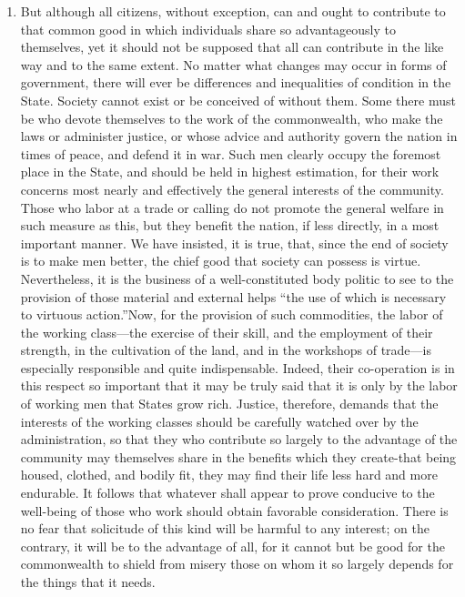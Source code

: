 \documentclass{book}
\begin{document}
\begin{enumerate}
	\item But although all citizens, without exception, can and ought to contribute to that common good in which individuals share so advantageously to themselves, yet it should not be supposed that all can contribute in the like way and to the same extent. No matter what changes may occur in forms of government, there will ever be differences and inequalities of condition in the State. Society cannot exist or be conceived of without them. Some there must be who devote themselves to the work of the commonwealth, who make the laws or administer justice, or whose advice and authority govern the nation in times of peace, and defend it in war. Such men clearly occupy the foremost place in the State, and should be held in highest estimation, for their work concerns most nearly and effectively the general interests of the community. Those who labor at a trade or calling do not promote the general welfare in such measure as this, but they benefit the nation, if less directly, in a most important manner. We have insisted, it is true, that, since the end of society is to make men better, the chief good that society can possess is virtue. Nevertheless, it is the business of a well-constituted body politic to see to the provision of those material and external helps “the use of which is necessary to virtuous action.”\footnotemark[27] Now, for the provision of such commodities, the labor of the working class—the exercise of their skill, and the employment of their strength, in the cultivation of the land, and in the workshops of trade—is especially responsible and quite indispensable. Indeed, their co-operation is in this respect so important that it may be truly said that it is only by the labor of working men that States grow rich. Justice, therefore, demands that the interests of the working classes should be carefully watched over by the administration, so that they who contribute so largely to the advantage of the community may themselves share in the benefits which they create-that being housed, clothed, and bodily fit, they may find their life less hard and more endurable. It follows that whatever shall appear to prove conducive to the well-being of those who work should obtain favorable consideration. There is no fear that solicitude of this kind will be harmful to any interest; on the contrary, it will be to the advantage of all, for it cannot but be good for the commonwealth to shield from misery those on whom it so largely depends for the things that it needs.



\end{enumerate}
\end{document}
